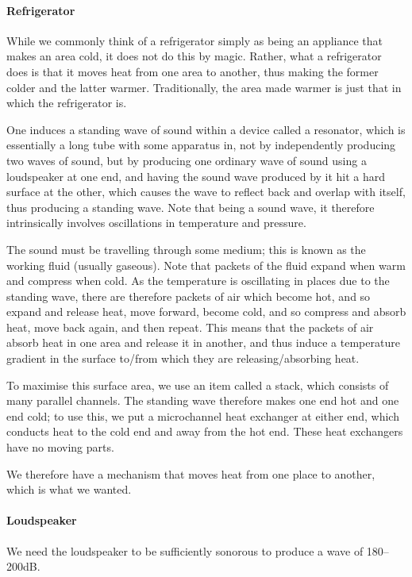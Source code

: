 \begin{multicols}{2}
\paragraph{Refrigerator} While we commonly think of a refrigerator simply as being an appliance that makes an area cold, it does not do this by magic. Rather, what a refrigerator does is that it moves heat from one area to another, thus making the former colder and the latter warmer. Traditionally, the area made warmer is just that in which the refrigerator is.

One induces a standing wave of sound within a device called a resonator, which is essentially a long tube with some apparatus in, not by independently producing two waves of sound, but by producing one ordinary wave of sound using a loudspeaker at one end, and having the sound wave produced by it hit a hard surface at the other, which causes the wave to reflect back and overlap with itself, thus producing a standing wave. Note that being a sound wave, it therefore intrinsically involves oscillations in temperature and pressure.

The sound must be travelling through some medium; this is known as the working fluid (usually gaseous). Note that packets of the fluid expand when warm and compress when cold. As the temperature is oscillating in places due to the standing wave, there are therefore packets of air which become hot, and so expand and release heat, move forward, become cold, and so compress and absorb heat, move back again, and then repeat. This means that the packets of air absorb heat in one area and release it in another, and thus induce a temperature gradient in the surface to/from which they are releasing/absorbing heat.

To maximise this surface area, we use an item called a stack, which consists of many parallel channels. The standing wave therefore makes one end hot and one end cold; to use this, we put a microchannel heat exchanger at either end, which conducts heat to the cold end and away from the hot end. These heat exchangers have no moving parts.

We therefore have a mechanism that moves heat from one place to another, which is what we wanted.

\paragraph{Loudspeaker} We need the loudspeaker to be sufficiently sonorous to produce a wave of 180--200dB.


\end{multicols}
